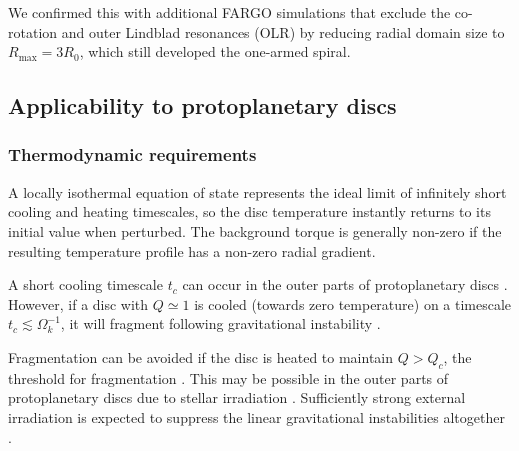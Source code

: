   We confirmed this with additional FARGO simulations that exclude the
  co-rotation and outer Lindblad resonances (OLR) by reducing radial domain
  size to $R_\mathrm{max} = 3 R_0$, which still developed 
  the one-armed spiral. 


  \subsection{Applicability to protoplanetary discs}
  
  \subsubsection{Thermodynamic requirements}  

  A locally isothermal equation of state represents the ideal limit
  of infinitely short cooling and heating timescales, so the 
  disc temperature instantly returns to its initial value when 
  perturbed. The background torque is generally non-zero if the 
  resulting temperature profile has a non-zero radial gradient.  
  
  A short cooling timescale $t_c$ can occur in the outer
  parts of protoplanetary discs 
  \citep{rafikov05,clarke09,rice09,cossins10b,tsukamoto15}.  %
  However, if a disc with $Q\simeq 1$ is cooled (towards zero
  temperature) on a timescale $t_c\lesssim\Omega_k^{-1}$, it will
  fragment following gravitational instability
  \citep{gammie01,rice05,paardekooper12}.  
  
  Fragmentation can be avoided if the disc is heated to maintain 
  $Q>Q_c$, the threshold for fragmentation \citep[$Q_c\simeq
  1.4$ for isothermal discs,][]{mayer04}. This may be 
  possible in the outer parts of protoplanetary discs due to
  stellar irradiation \citep{rafikov09,kratter11,zhu12}. Sufficiently strong
  external irradiation is expected to suppress the linear gravitational
  instabilities altogether \citep{rice11}.  

